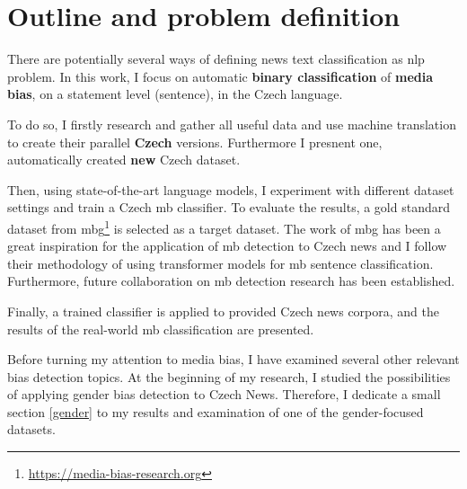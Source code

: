 \section{Outline and problem definition}
There are potentially several ways of defining news text classification as \gls{nlp} problem.
In this work, I focus on automatic \textbf{binary classification} of \textbf{media bias}, on a statement level (sentence), in the Czech language.

To do so, I firstly research and gather all useful data and use machine translation to create their parallel \textbf{Czech} versions. Furthermore I presnent one, automatically created \textbf{new} Czech dataset. 

Then, using state-of-the-art language models, I experiment with different dataset settings and train a Czech \gls{mb} classifier. To evaluate the results, a gold standard dataset from \gls{mbg}\footnote{\url{https://media-bias-research.org}} is selected as a target dataset. The work of \gls{mbg} has been a great inspiration for the application of \gls{mb} detection to Czech news and I follow their methodology of using transformer models for \gls{mb} sentence classification. Furthermore, future collaboration on \gls{mb} detection research has been established.

Finally, a trained classifier is applied to provided Czech news corpora, and the results of the real-world \gls{mb} classification are presented.

Before turning my attention to media bias, I have examined several other relevant bias detection topics. At the beginning of my research, I studied the possibilities of applying gender bias detection to Czech News. Therefore, I dedicate a small section \ref{gender} to my results and examination of one of the gender-focused datasets.